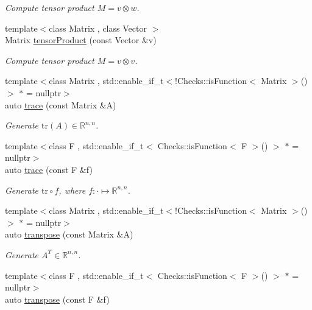 \begin{DoxyCompactItemize}
\begin{DoxyCompactList}\small\item\em \-Compute tensor product $ M = v \otimes w $. \end{DoxyCompactList}\item 
{\footnotesize template$<$class Matrix , class Vector $>$ }\\\-Matrix \hyperlink{group__LinearAlgebraGroup_gae5e82b9e66319511dae5ff0d9304a6b7}{tensor\-Product} (const \-Vector \&v)
\begin{DoxyCompactList}\small\item\em \-Compute tensor product $ M = v \otimes v $. \end{DoxyCompactList}\item 
{\footnotesize template$<$class Matrix , std\-::enable\-\_\-if\-\_\-t$<$!\-Checks\-::is\-Function$<$ Matrix $>$()$>$ $\ast$  = nullptr$>$ }\\auto \hyperlink{group__LinearAlgebraGroup_ga4d73eb4d46dd9196a31e2d6d557d509e}{trace} (const \-Matrix \&\-A)
\begin{DoxyCompactList}\small\item\em \-Generate $\mathrm{tr}(A)\in\mathbb{R}^{n,n}$. \end{DoxyCompactList}\item 
{\footnotesize template$<$class F , std\-::enable\-\_\-if\-\_\-t$<$ Checks\-::is\-Function$<$ F $>$() $>$ $\ast$  = nullptr$>$ }\\auto \hyperlink{group__LinearAlgebraGroup_ga950717870525c43be79245413717673c}{trace} (const \-F \&f)
\begin{DoxyCompactList}\small\item\em \-Generate $\mathrm{tr}\circ f$, where $f:\cdot\mapsto\mathbb{R}^{n,n} $. \end{DoxyCompactList}\item 
{\footnotesize template$<$class Matrix , std\-::enable\-\_\-if\-\_\-t$<$!\-Checks\-::is\-Function$<$ Matrix $>$()$>$ $\ast$  = nullptr$>$ }\\auto \hyperlink{group__LinearAlgebraGroup_ga6110875ecb3c2559f8f4b42a3627a65b}{transpose} (const \-Matrix \&\-A)
\begin{DoxyCompactList}\small\item\em \-Generate $A^T\in\mathbb{R}^{n,n}$. \end{DoxyCompactList}\item 
{\footnotesize template$<$class F , std\-::enable\-\_\-if\-\_\-t$<$ Checks\-::is\-Function$<$ F $>$() $>$ $\ast$  = nullptr$>$ }\\auto \hyperlink{group__LinearAlgebraGroup_ga410ef1b161789c0c9f01ae5f5caf058f}{transpose} (const \-F \&f)

\end{DoxyCompactItemize}
